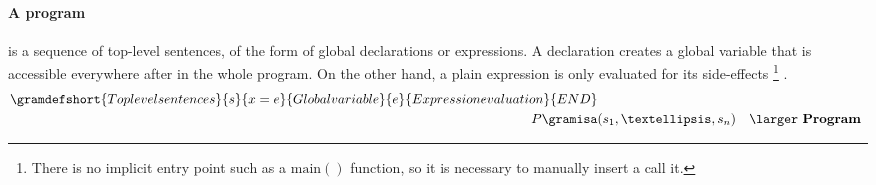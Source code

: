 \paragraph{A program} is a sequence of top-level sentences, of the form of
global declarations or expressions. A declaration creates a global variable
that is accessible everywhere after in the whole program.
On the other hand, a plain expression is only evaluated for its side-effects
\footnote{
  There is no implicit entry point such as a $\mathrm{main}()$ function, so
  it is necessary to manually insert a call it.
}
.%
{ \small
\begin{align*}
  \gramdefshort{Toplevel sentences}{s}
                 { x = e }{Global variable}
                 { e     }{Expression evaluation}
                 {END}
  \\
  P \gramisa & (s_1, …, s_n) & {\textrm{\larger \textbf{Program} } }
\end{align*}}%
